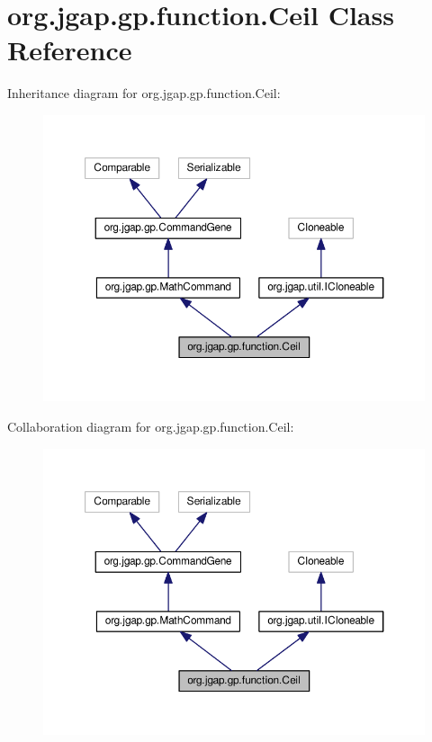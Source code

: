 \hypertarget{classorg_1_1jgap_1_1gp_1_1function_1_1_ceil}{\section{org.\-jgap.\-gp.\-function.\-Ceil Class Reference}
\label{classorg_1_1jgap_1_1gp_1_1function_1_1_ceil}
}


Inheritance diagram for org.\-jgap.\-gp.\-function.\-Ceil\-:
\nopagebreak
\begin{figure}[H]
\begin{center}
\leavevmode
\includegraphics[width=350pt]{classorg_1_1jgap_1_1gp_1_1function_1_1_ceil__inherit__graph}
\end{center}
\end{figure}


Collaboration diagram for org.\-jgap.\-gp.\-function.\-Ceil\-:
\nopagebreak
\begin{figure}[H]
\begin{center}
\leavevmode
\includegraphics[width=350pt]{classorg_1_1jgap_1_1gp_1_1function_1_1_ceil__coll__graph}
\end{center}
\end{figure}
